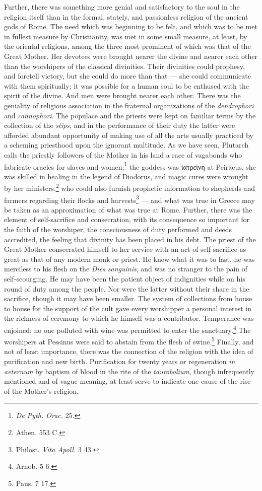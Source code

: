 \documentclass[a4paper, 11pt, oneside, polutonikogreek, english]{article}
\begin{document}
Further, there was something more genial and satisfactory to the soul in the religion itself than in the formal, stately, and passionless religion of the ancient gods of Rome. The need which was beginning to be felt, and which was to be met in fullest measure by Christianity, was met in some small measure, at least, by the oriental religions, among the three most prominent of which was that of the Great Mother. Her devotees were brought nearer the divine and nearer each other than the worshipers of the classical divinities. Their divinities could prophesy, and foretell victory, but she could do more than that --- she could communicate with them spiritually; it was possible for a human soul to be enthused with the spirit of the divine. And men were brought nearer each other. There was the geniality of religious association in the fraternal organizations of the \emph{dendrophori} and \emph{cannophori}. The populace and the priests were kept on familiar terms by the collection of the \emph{stips}, and in the performance of their duty the latter were afforded abundant opportunity of making use of all the arts usually practiced by a scheming priesthood upon the ignorant multitude. As we have seen, Plutarch calls the priestly followers of the Mother in his land a race of vagabonds who fabricate oracles for slaves and women;\footnote{\emph{De Pyth. Orac.} 25.} the goddess was ἰατρείνη at Peiraeus, she was skilled in healing in the legend of Diodorus, and magic cures were wrought by her ministers,\footnote{Athen. 553 C.} who could also furnish prophetic information to shepherds and farmers regarding their flocks and harvests\footnote{Philost. \emph{Vita Apoll.} 3 43.} --- and what was true in Greece may be taken as an approximation of what was true at Rome. Further, there was the element of self-sacrifice and consecration, with its consequence so important for the faith of the worshiper, the consciousness of duty performed and deeds accredited, the feeling that divinity has been placed in his debt. The priest of the Great Mother consecrated himself to her service with an act of self-sacrifice as great as that of any modern monk or priest. He knew what it was to fast, he was merciless to his flesh on the \emph{Dies sanguinis}, and was no stranger to the pain of self-scourging. He may have been the patient object of indignities while on his round of duty among the people. Nor were the latter without their share in the sacrifice, though it may have been smaller. The system of collections from house to house for the support of the cult gave every worshipper a personal interest in the richness of ceremony to which he himself was a contributor. Temperance was enjoined; no one polluted with wine was permitted to enter the sanctuary.\footnote{Arnob. 5 6.} The worshipers at Pessinus were said to abstain from the flesh of swine.\footnote{Paus. 7 17.} Finally, and not of least importance, there was the connection of the religion with the idea of purification and new birth. Purification for twenty years or regeneration \emph{in aeternum} by baptism of blood in the rite of the \emph{taurobolium}, though infrequently mentioned and of vague meaning, at least serve to indicate one cause of the rise of the Mother's religion.
\end{document}
